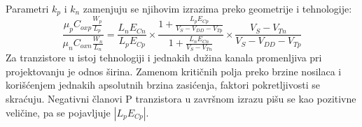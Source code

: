 Parametri $k_p$ i $k_n$ zamenjuju se njihovim izrazima preko geometrije i tehnologije:
\[\frac{\mu_pC_{oxp}\frac{W_p}{L_p}}{\mu_nC_{oxn}\frac{W_n}{L_n}}=\frac{L_nE_{Cn}}{L_pE_{Cp}}\times\frac{1+\frac{L_pE_{Cp}}{V_S-V_{DD}-V_{Tp}}}{1+\frac{L_nE_{Cn}}{V_S-V_{Tn}}}\times\frac{V_S-V_{Tn}}{V_S-V_{DD}-V_{Tp}}\]
Za tranzistore u istoj tehnologiji i jednakih dužina kanala promenljiva pri projektovanju je odnos širina. Zamenom kritičnih polja preko brzine nosilaca i korišćenjem jednakih apsolutnih brzina zasićenja, faktori pokretljivosti se skraćuju. Negativni članovi P tranzistora u završnom izrazu pišu se kao pozitivne veličine, pa se pojavljuje $|L_pE_{Cp}|$.
